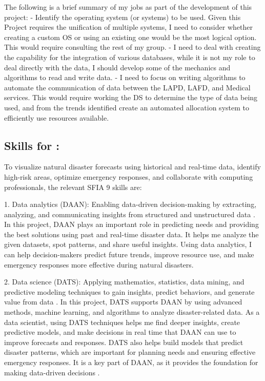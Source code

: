 \documentclass[a4paper, 11pt]{report}
\begin{document}
The following is a brief summary of my jobs as part of the development of this project:
- Identify the operating system (or systems) to be used. Given this Project requires the unification of multiple systems, I need to consider whether creating a custom OS or using an existing one would be the most logical option. This would require consulting the rest of my group. 
- I need to deal with creating the capability for the integration of various databases, while it is not my role to deal directly with the data, I should develop some of the mechanics and algorithms to read and write data. 
- I need to focus on writing algorithms to automate the communication of data between the LAPD, LAFD, and Medical services. This would require working the DS to determine the type of data being used, and from the trends identified create an automated allocation system to efficiently use resources available. 


\subsection{Skills for \majB: \studB}

To visualize natural disaster forecasts using historical and real-time data, identify high-risk areas, optimize emergency responses, and collaborate with computing professionals, the relevant SFIA 9 skills are:

1. Data analytics (DAAN): Enabling data-driven decision-making by extracting, analyzing, and communicating insights from structured and unstructured data \cite{palma2023}. In this project, DAAN plays an important role in predicting needs and providing the best solutions using past and real-time disaster data. It helps me analyze the given datasets, spot patterns, and share useful insights. Using data analytics, I can help decision-makers predict future trends, improve resource use, and make emergency responses more effective during natural disasters.


2. Data science (DATS): Applying mathematics, statistics, data mining, and predictive modeling techniques to gain insights, predict behaviors, and generate value from data \cite{palma2023}. In this project, DATS supports DAAN by using advanced methods, machine learning, and algorithms to analyze disaster-related data. As a data scientist, using DATS techniques helps me find deeper insights, create predictive models, and make decisions in real time that DAAN can use to improve forecasts and responses. DATS also helps build models that predict disaster patterns, which are important for planning needs and ensuring effective emergency responses. It is a key part of DAAN, as it provides the foundation for making data-driven decisions \cite{anderson2008}.
\end{document}
